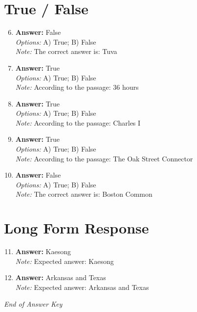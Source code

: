 \documentclass[12pt]{article}
\begin{document}
\section*{True / False}
\begin{enumerate}[label=\arabic*.]
\setcounter{enumi}{5}
\item \textbf{Answer:} False
\\ \textit{Options:} A) True; B) False
\\ \textit{Note:} The correct answer is: Tuva
\item \textbf{Answer:} True
\\ \textit{Options:} A) True; B) False
\\ \textit{Note:} According to the passage: 36 hours
\item \textbf{Answer:} True
\\ \textit{Options:} A) True; B) False
\\ \textit{Note:} According to the passage: Charles I
\item \textbf{Answer:} True
\\ \textit{Options:} A) True; B) False
\\ \textit{Note:} According to the passage: The Oak Street Connector
\item \textbf{Answer:} False
\\ \textit{Options:} A) True; B) False
\\ \textit{Note:} The correct answer is: Boston Common
\end{enumerate}

\section*{Long Form Response}
\begin{enumerate}[label=\arabic*.]
\setcounter{enumi}{10}
\item \textbf{Answer:} Kaesong
\\ \textit{Note:} Expected answer: Kaesong
\item \textbf{Answer:} Arkansas and Texas
\\ \textit{Note:} Expected answer: Arkansas and Texas
\end{enumerate}

\vfill
\noindent\textit{End of Answer Key}
\end{document}
